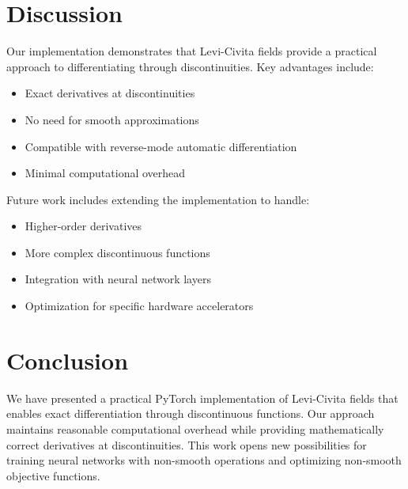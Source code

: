 \documentclass{article}
\begin{document}
\section{Discussion}

Our implementation demonstrates that Levi-Civita fields provide a practical approach to differentiating through discontinuities. Key advantages include:

\begin{itemize}
    \item Exact derivatives at discontinuities
    \item No need for smooth approximations
    \item Compatible with reverse-mode automatic differentiation
    \item Minimal computational overhead
\end{itemize}

Future work includes extending the implementation to handle:
\begin{itemize}
    \item Higher-order derivatives
    \item More complex discontinuous functions
    \item Integration with neural network layers
    \item Optimization for specific hardware accelerators
\end{itemize}

\section{Conclusion}

We have presented a practical PyTorch implementation of Levi-Civita fields that enables exact differentiation through discontinuous functions. Our approach maintains reasonable computational overhead while providing mathematically correct derivatives at discontinuities. This work opens new possibilities for training neural networks with non-smooth operations and optimizing non-smooth objective functions.
\end{document}
